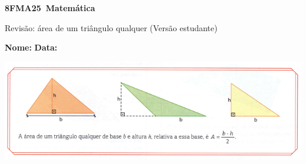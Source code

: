 \documentclass[a4paper,14pt]{article}
\begin{document}
	
	\noindent\textbf{8FMA25~Matemática} 
	
	\begin{center}Revisão: área de um triângulo qualquer (Versão estudante)
	\end{center}
	
	\noindent\textbf{Nome:} \underline{\hspace{10cm}}
	\noindent\textbf{Data:} \underline{\hspace{4cm}}
	
    \begin{center}
    	\includegraphics[width=1\linewidth]{8FMA25_imagens/imagem1}
    \end{center}
    
\end{document}
